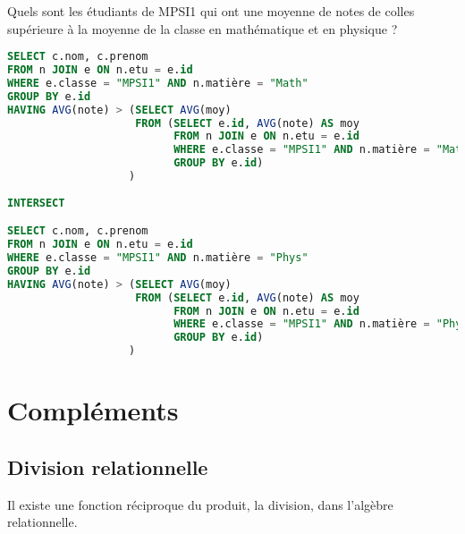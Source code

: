 \begin{Exercise}
Quels sont les étudiants de MPSI1 qui ont une moyenne de notes de colles supérieure à la moyenne de la classe en mathématique et en physique ?
\end{Exercise}
\begin{Answer}
\begin{lstlisting}[language=SQL]
SELECT c.nom, c.prenom
FROM n JOIN e ON n.etu = e.id
WHERE e.classe = "MPSI1" AND n.matière = "Math"
GROUP BY e.id
HAVING AVG(note) > (SELECT AVG(moy)
                    FROM (SELECT e.id, AVG(note) AS moy 
                          FROM n JOIN e ON n.etu = e.id
                          WHERE e.classe = "MPSI1" AND n.matière = "Math"
                          GROUP BY e.id)
                   )
                   
INTERSECT

SELECT c.nom, c.prenom
FROM n JOIN e ON n.etu = e.id
WHERE e.classe = "MPSI1" AND n.matière = "Phys"
GROUP BY e.id
HAVING AVG(note) > (SELECT AVG(moy)
                    FROM (SELECT e.id, AVG(note) AS moy 
                          FROM n JOIN e ON n.etu = e.id
                          WHERE e.classe = "MPSI1" AND n.matière = "Phys"
                          GROUP BY e.id)
                   )
\end{lstlisting}
\end{Answer}
\newpage
\section{Compléments} 
\subsection{Division relationnelle}
Il existe une fonction réciproque du produit, la division, dans l'algèbre relationnelle. 

